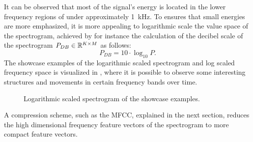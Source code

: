\FloatBarrier
\noindent
It can be observed that most of the signal's energy is located in the lower frequency regions of under approximately \SI{1}{\kilo\hertz}.
To ensures that small energies are more emphasized, it is more appealing to logarithmic scale the value space of the spectrogram, achieved by for instance the calculation of the decibel scale of the spectrogram $P_{DB} \in \mathbb{R}^{K \times M}$ as follows:
\begin{equation}\label{eq:signal_spec_log}
  P_{DB} = 10 \cdot \log_{10}{P}.
\end{equation}
The showcase examples of the logarithmic scaled spectrogram and log scaled frequency space is visualized in , where it is possible to observe some interesting structures and movements in certain frequency bands over time.
\begin{figure}[!ht]
  \centering
  \caption{Logarithmic scaled spectrogram of the showcase examples.}
  \label{fig:signal_spec_log_showcase}
\end{figure}
\FloatBarrier
\noindent
A compression scheme, such as the MFCC, explained in the next section, reduces the high dimensional frequency feature vectors of the spectrogram to more compact feature vectors.